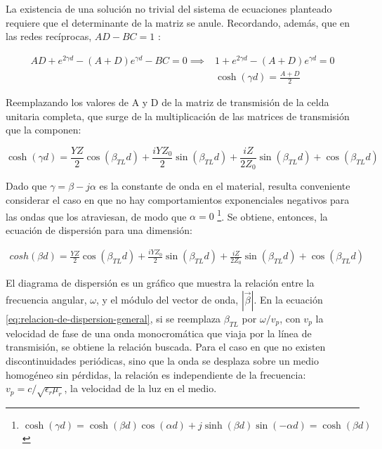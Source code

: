 La existencia de una solución no trivial del sistema de ecuaciones planteado requiere que el determinante de la matriz se anule. Recordando, además, que en las redes recíprocas, $AD-BC=1$ \cite{Pozar:MwEngineering}:

\begin{subequations}
	\begin{align}
		AD + e^{2 \gamma d} - (A+D)e^{\gamma d}-BC = 0 \implies &1+e^{2\gamma d}-(A+D)e^{\gamma d} = 0 \\
		&\cosh (\gamma d) = \frac{A+D}{2}
	\end{align}
\end{subequations}

Reemplazando los valores de A y D de la matriz de transmisión de la celda unitaria completa, que surge de la multiplicación de las matrices de transmisión que la componen:

\begin{equation}
\cosh (\gamma d) = \frac{Y Z}{2} \cos{\left (\beta_{TL} d \right )} + \frac{i Y Z_{0}}{2} \sin{\left (\beta_{TL} d \right )} + \frac{i Z}{2 Z_{0}} \sin{\left (\beta_{TL} d \right )} + \cos{\left (\beta_{TL} d \right )}
\end{equation}

Dado que $\gamma = \beta -j\alpha$ es la constante de onda en el material, resulta conveniente considerar el caso en que no hay comportamientos exponenciales negativos para las ondas que los atraviesan, de modo que $\alpha=0$ \footnote{$\cosh (\gamma d) = \cosh(\beta d)\cos(\alpha d) + j \sinh(\beta d) \sin(-\alpha d) = \cosh (\beta d)$}. Se obtiene, entonces, la ecuación de dispersión para una dimensión:

\begin{align}
	\label{eq:relacion-de-dispersion-general}
	cosh(\beta d) = \frac{Y Z}{2} \cos{\left (\beta_{TL} d \right )} + \frac{i Y Z_{0}}{2} \sin{\left (\beta_{TL} d \right )} + \frac{i Z}{2 Z_{0}} \sin{\left (\beta_{TL} d \right )} + \cos{\left (\beta_{TL} d \right )}
\end{align}

El diagrama de dispersión es un gráfico que muestra la relación entre la frecuencia angular, $\omega$, y el módulo del vector de onda, $|\vec{\beta}|$. En la ecuación \ref{eq:relacion-de-dispersion-general}, si se reemplaza $\beta_{TL}$ por $\omega/v_p$, con $v_p$ la velocidad de fase de una onda monocromática que viaja por la línea de transmisión, se obtiene la relación buscada. Para el caso en que no existen discontinuidades periódicas, sino que la onda se desplaza sobre un medio homogéneo sin pérdidas, la relación es independiente de la frecuencia: $v_p = c/\sqrt{\epsilon_r \mu_r}$, la velocidad de la luz en el medio.


